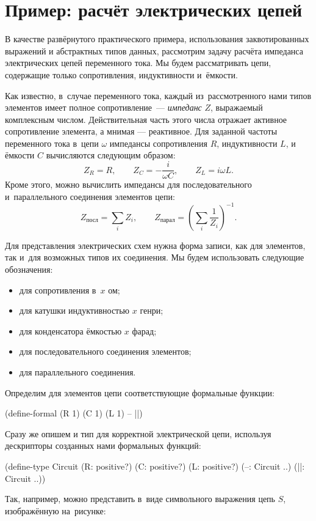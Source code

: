 
\section{Пример: расчёт электрических цепей}%
В качестве развёрнутого практического примера, использования заквотированных выражений и абстрактных типов данных, рассмотрим задачу расчёта импеданса электрических цепей переменного тока. Мы будем рассматривать цепи, содержащие только сопротивления, индуктивности и~ёмкости.

Как известно, в~случае переменного тока, каждый из~рассмотренного нами типов элементов имеет полное сопротивление~--- \emph{импеданс} $Z$, выражаемый комплексным числом. Действительная часть этого числа отражает активное сопротивление элемента, а мнимая --- реактивное. Для заданной частоты переменного тока в~цепи $\omega$ импедансы сопротивления $R$, индуктивности $L$, и ёмкости $C$ вычисляются следующим образом:
$$Z_R = R,\qquad Z_C = -\frac{i}{\omega C},\qquad Z_L = i\omega L.$$
Кроме этого, можно вычислить импедансы для последовательного и~параллельного соединения элементов цепи:
$$Z_\text{посл} = \sum\limits_i Z_i,\qquad  Z_\text{парал}= \left(\sum\limits_i\frac1{Z_i}\right)^{-1}.$$

Для представления электрических схем нужна форма записи, как для элементов, так и~для возможных типов их соединения. Мы будем использовать следующие обозначения:

\begin{itemize}
 \item[]  для сопротивления в~$x$ ом;

 \item[]  для катушки индуктивностью $x$ генри;

 \item[]  для конденсатора ёмкостью $x$ фарад;

 \item[]  для последовательного соединения элементов;

 \item[]  для параллельного соединения.
\end{itemize}

Определим для элементов цепи соответствующие формальные функции:
\begin{Definition}
(define-formal 
  (R 1) (C 1) (L 1) -- ||)
\end{Definition}
\noindent Сразу же опишем и тип для корректной электрической цепи, используя дескрипторы созданных нами формальных функций:
\begin{Definition}
(define-type Circuit
  (R: positive?)
  (C: positive?)
  (L: positive?)
  (--: Circuit ..)
  (||: Circuit ..))
\end{Definition}
Так, например, можно представить в~виде символьного выражения цепь $S$, изображённую на~рисунке:

